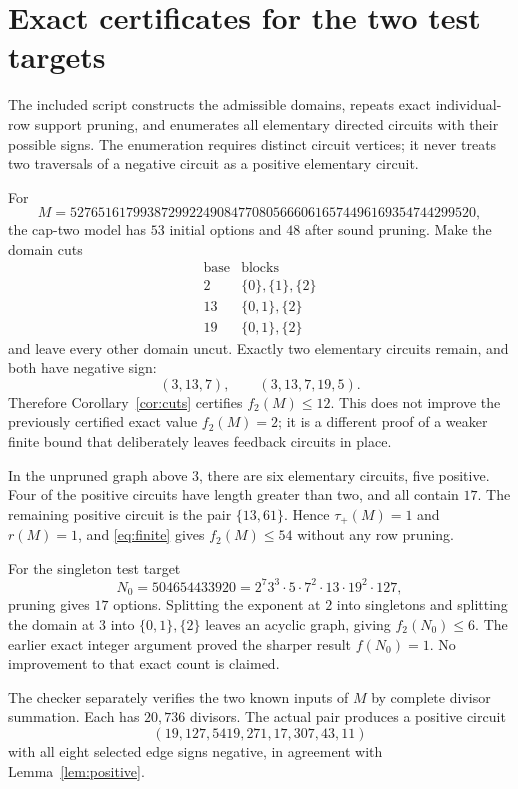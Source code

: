 \documentclass[11pt]{article}
\begin{document}
\section{Exact certificates for the two test targets}
The included script constructs the admissible domains, repeats exact individual-row support pruning, and enumerates all elementary directed circuits with their possible signs. The enumeration requires distinct circuit vertices; it never treats two traversals of a negative circuit as a positive elementary circuit.

For
\[
 M=5276516179938729922490847708056660616574496169354744299520,
\]
the cap-two model has $53$ initial options and $48$ after sound pruning. Make the domain cuts
\[
 \begin{array}{c|c}
 \text{base}&\text{blocks}\\ \hline
 2&\{0\},\{1\},\{2\}\\
 13&\{0,1\},\{2\}\\
 19&\{0,1\},\{2\}
 \end{array}
\]
and leave every other domain uncut. Exactly two elementary circuits remain, and both have negative sign:
\[
 (3,13,7),\qquad(3,13,7,19,5).
\]
Therefore Corollary~\ref{cor:cuts} certifies $f_2(M)\le12$. This does not improve the previously certified exact value $f_2(M)=2$; it is a different proof of a weaker finite bound that deliberately leaves feedback circuits in place.

In the unpruned graph above $3$, there are six elementary circuits, five positive. Four of the positive circuits have length greater than two, and all contain $17$. The remaining positive circuit is the pair $\{13,61\}$. Hence $\tau_+(M)=1$ and $r(M)=1$, and \eqref{eq:finite} gives $f_2(M)\le54$ without any row pruning.

For the singleton test target
\[
 N_0=504654433920=2^7 3^3\cdot5\cdot7^2\cdot13\cdot19^2\cdot127,
\]
pruning gives $17$ options. Splitting the exponent at $2$ into singletons and splitting the domain at $3$ into $\{0,1\},\{2\}$ leaves an acyclic graph, giving $f_2(N_0)\le6$. The earlier exact integer argument proved the sharper result $f(N_0)=1$. No improvement to that exact count is claimed.

The checker separately verifies the two known inputs of $M$ by complete divisor summation. Each has $20{,}736$ divisors. The actual pair produces a positive circuit
\[
 (19,127,5419,271,17,307,43,11)
\]
with all eight selected edge signs negative, in agreement with Lemma~\ref{lem:positive}.
\end{document}
